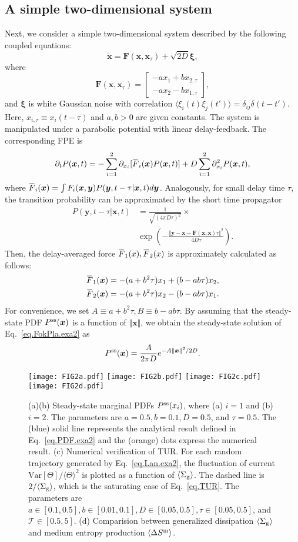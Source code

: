\documentclass[pre,
twocolumn,
]{revtex4-1}
\newcommand{\overbar}[1]{\mkern 1.5mu\overline{\mkern-1.5mu#1\mkern-1.5mu}\mkern 1.5mu}
\theoremstyle{definition}
\theoremstyle{definition}
\newcommand{\bol}{\boldsymbol}
\newcommand{\mca}{\mathcal}
\newcommand{\mrm}{\mathrm}
\newcommand{\eq}[1]{\begin{equation}#1\end{equation}}
\newcommand{\als}[1]{\begin{align*}#1\end{align*}}
\newcommand{\avg}[1]{\langle #1\rangle}
\newcommand{\inl}[1]{$ #1 $}
\newcommand{\bra}[1]{\left( #1 \right)}
\newcommand{\norm}[1]{\Vert #1 \Vert}
\begin{document}
\subsection{A simple two-dimensional system}
Next, we consider a simple two-dimensional system described by the following coupled equations:
\eq{
\dot{\bol{x}}=\bol{F}(\bol{x},\bol{x}_\tau)+\sqrt{2D}\bol{\xi},\label{eq.Lan.exa2}
}
where
\eq{
\bol{F}(\bol{x},\bol{x}_\tau)=\begin{bmatrix}
-ax_1+bx_{2,\tau}\\
-ax_2-bx_{1,\tau}
\end{bmatrix}
,
}
and \inl{\bol{\xi}} is white Gaussian noise with correlation \inl{\avg{\xi_i(t)\xi_j(t')}=\delta_{ij}\delta(t-t')}.
Here, \inl{x_{i,\tau}\equiv x_i(t-\tau)} and \inl{a,b>0} are given constants.
The system is manipulated under a parabolic potential with linear delay-feedback.
The corresponding FPE is
\eq{
\partial_tP(\bol{x},t)=-\sum_{i=1}^2\partial_{x_i}[\overbar{F}_i(\bol{x})P(\bol{x},t)]+D\sum_{i=1}^2\partial_{x_i}^2P(\bol{x},t),\label{eq.FokPla.exa2}
}
where \inl{\overbar{F}_i(\bol{x})=\int F_i(\bol{x},\bol{y})P(\bol{y},t-\tau|\bol{x},t)d\bol{y}}.
Analogously, for small delay time \inl{\tau}, the transition probability can be approximated by the short time propagator
\als{
P(\bol{y},t-\tau|\bol{x},t)&=\frac{1}{\sqrt{(4\pi D\tau)^2}}\times\\
&\exp\bra{-\frac{\norm{\bol{y}-\bol{x}-\bol{F}(\bol{x},\bol{x})\tau}^2}{4D\tau}}.
}
Then, the delay-averaged force \inl{\overbar{F}_1(x),\overbar{F}_2(x)} is approximately calculated as follows:
\als{
\overbar{F}_1(\bol{x})&=-(a+b^2\tau)x_1+(b-ab\tau)x_2,\\
\overbar{F}_2(\bol{x})&=-(a+b^2\tau)x_2-(b-ab\tau)x_1.
}
For convenience, we set \inl{A\equiv a+b^2\tau,B\equiv b-ab\tau}.
By assuming that the steady-state PDF \inl{P^{\rm ss}(\bol{x})} is a function of \inl{\norm{\bol{x}}}, we obtain the steady-state solution of Eq.~\eqref{eq.FokPla.exa2} as
\eq{
P^{\rm ss}(\bol{x})=\frac{A}{2\pi D}e^{-A\norm{\bol{x}}^2/2D}.\label{eq.PDF.exa2}
}
\begin{figure}[t]
	\centering
	\texttt{[image: FIG2a.pdf]}
	\texttt{[image: FIG2b.pdf]}
	\texttt{[image: FIG2c.pdf]}
	\texttt{[image: FIG2d.pdf]}
	\caption{(a)(b) Steady-state marginal PDFs \inl{P^{\rm ss}(x_i)}, where (a) \inl{i=1} and (b) \inl{i=2}. The parameters are \inl{a=0.5,b=0.1,D=0.5}, and \inl{\tau=0.5}. The (blue) solid line represents the analytical result defined in Eq.~\eqref{eq.PDF.exa2} and the (orange) dots express the numerical result. (c) Numerical verification of TUR. For each random trajectory generated by Eq.~\eqref{eq.Lan.exa2}, the fluctuation of current \inl{\mrm{Var}[\Theta]/\avg{\Theta}^2} is plotted as a function of \inl{\avg{\Sigma_{\rm g}}}. The dashed line is \inl{2/\avg{\Sigma_{\rm g}}}, which is the saturating case of Eq.~\eqref{eq.TUR}. The parameters are \inl{a\in[0.1,0.5],b\in[0.01,0.1],D\in[0.05,0.5],\tau\in[0.05,0.5]}, and \inl{\mca{T}\in[0.5,5]}. (d) Comparision between generalized dissipation \inl{\avg{\Sigma_{\rm g}}} and medium entropy production \inl{\avg{\Delta S^{\rm m}}}.}\label{fig.exa2}
\end{figure}
\end{document}

